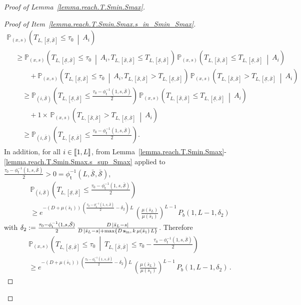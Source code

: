 \documentclass[10pt]{amsart}
\theoremstyle{definition}\newtheorem{defi}[theo]{Definition}\newtheorem{rema}[theo]{Remark}\newtheorem{exam}[theo]{Example}\newtheorem{exem}[theo]{Example}\newtheorem{nota}[theo]{Notation}
\newcommand{\llbracket}{\mathopen{[\mkern -2.7mu[}}
\newcommand{\rrbracket}{\mathclose{]\mkern -2.7mu]}}
\newcommand{\PP}{\mathbb{P}}
\newcommand{\Sin}{{\mathbf s}_{\textrm{\tiny\rm in}}}
\newcommand{\Smin}{\underline{\mathcal{S}}}
\newcommand{\Smax}{\bar{\mathcal{S}}}
\newcommand{\barmu}{\mu(\bar s_1)}
\newcommand{\phit}{\phi_\textsf{t}^{-1}}
\newcommand{\1}{\mathbf{1}}
\begin{document}
\begin{proof}[Proof of Lemma~\ref{lemma.reach.T.Smin.Smax}]
\begin{proof}[{Proof of Item~\eqref{lemma.reach.T.Smin.Smax.s_in_Smin_Smax}}]
\begin{multline*}
\PP_{(x,s)}
\left(T_{L,[\Smin,\Smax]}\leq\tau_0 \ \middle| \ A_i \right)\\
\begin{aligned}
&\geq
\PP_{(x,s)}
\left(T_{L,\left[\Smin,\Smax\right]}\leq\tau_0 \ \middle| \ A_i, T_{L,\left[\Smax,\Smax\right]}\leq T_{L,\left[\Smin,\Smax\right]}\right)\,
\PP_{(x,s)}\left(T_{L,\left[\Smax,\Smax\right]}\leq T_{L,\left[\Smin,\Smax\right]} \ \middle| \ A_i \right)
\\
&\qquad +
\PP_{(x,s)}
\left(T_{L,\left[\Smin,\Smax\right]}\leq\tau_0 \ \middle| \ A_i, T_{L,\left[\Smax,\Smax\right]}> T_{L,\left[\Smin,\Smax\right]} \right)\,
\PP_{(x,s)}\left(T_{L,\left[\Smax,\Smax\right]}> T_{L,\left[\Smin,\Smax\right]} \ \middle| \ A_i \right)
\\
&\quad\geq
\PP_{(i,\Smax)}
\left(T_{L,\left[\Smin,\Smax\right]}\leq \frac{\tau_0-\phit\left(1, s,\Smax\right)}{2}\right)\,
\PP_{(x,s)}\left(T_{L,\left[\Smax,\Smax\right]}\leq T_{L,[\Smin,\Smax]} \ \middle| \ A_i \right)
\\
&\qquad + 1\times\,
\PP_{(x,s)}\left(T_{L,\left[\Smax,\Smax\right]}> T_{L,\left[\Smin,\Smax\right]} \ \middle| \ A_i \right)
\\
&\quad\geq
\PP_{(i,\Smax)}
\left(T_{L,\left[\Smin,\Smax\right]}\leq \frac{\tau_0-\phit\left(1, s,\Smax\right)}{2}\right).
\end{aligned}
\end{multline*}
In addition, for all $i \in \llbracket 1, L \rrbracket$, from Lemma~\ref{lemma.reach.T.Smin.Smax}-\ref{lemma.reach.T.Smin.Smax.s_sup_Smax} applied to $\frac{\tau_0-\phit(1, s,\Smax)}{2}>0=\phit(L,\Smax,\Smax)$,
\begin{multline*}
\PP_{(i,\Smax)}\left(T_{L,\left[\Smin,\Smax\right]}\leq \frac{\tau_0-\phit\left(1, s,\Smax\right)}{2}\right)\\
\geq e^{-(D+\barmu)\,\left(\frac{\tau_0-\phit\left(1, s,\Smax\right)}{2}-\delta_2\right)\,L}\,
\left(\frac{\mu(\bar s_L)}{\barmu}\right)^{L-1}\,P_b(1,L-1, \delta_2)
\end{multline*}
with $\delta_2:=\frac{\tau_0-\phit(1, s,\Smax)}{2}\,\frac{D\,|\bar s_L-s|}{D\,|\bar s_L-s|+\max\{D\,\Sin,\,k\,\barmu\,L\}}$. Therefore
\begin{multline}\label{lemma.reachS.integrand}
\PP_{(x,s)}\left(T_{L,[\Smin,\Smax]}\leq\tau_0\ \middle| \ T_{L,[\Smax,\Smax]}\leq \tau_0-\frac{\tau_0-\phit\left(1, s,\Smax\right)}{2} \right)
\\
\geq e^{-(D+\barmu)\,\left(\frac{\tau_0-\phit\left(1, s,\Smax\right)}{2}-\delta_2\right)\,L}\,
\left(\frac{\mu(\bar s_L)}{\barmu}\right)^{L-1}\,P_b(1,L-1, \delta_2)\,.
\end{multline}


\end{proof}
\end{proof}
\end{document}
